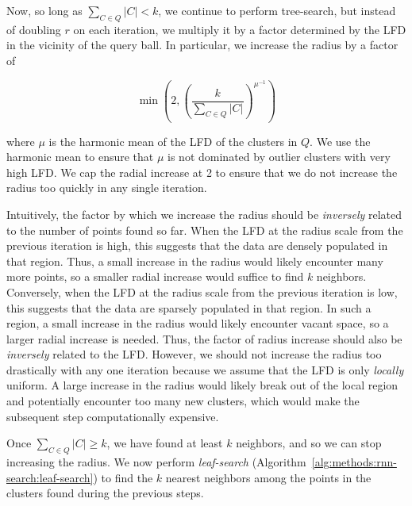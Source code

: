 Now, so long as $\sum_{C \in Q} |C| < k$, we continue to perform tree-search, but instead of doubling $r$ on each iteration, we multiply it by a factor determined by the LFD in the vicinity of the query ball.
In particular, we increase the radius by a factor of

\begin{equation}
    \min \left(2, \left( {\frac{k}{\sum_{C \in Q} |C|}} \right)^{\mu^{-1}} \right)
    \label{eq:methods:repeated-rnn-factor}
\end{equation}

where $\mu$ is the harmonic mean of the LFD of the clusters in $Q$.
We use the harmonic mean to ensure that $\mu$ is not dominated by outlier clusters with very high LFD.
We cap the radial increase at 2 to ensure that we do not increase the radius too quickly in any single iteration.

Intuitively, the factor by which we increase the radius should be \textit{inversely} related to the number of points found so far.
When the LFD at the radius scale from the previous iteration is high, this suggests that the data are densely populated in that region.
Thus, a small increase in the radius would likely encounter many more points, so a smaller radial increase would suffice to find $k$ neighbors.
Conversely, when the LFD at the radius scale from the previous iteration is low, this suggests that the data are sparsely populated in that region.
In such a region, a small increase in the radius would likely encounter vacant space, so a larger radial increase is needed.
Thus, the factor of radius increase should also be \textit{inversely} related to the LFD.
However, we should not increase the radius too drastically with any one iteration because we assume that the LFD is only \textit{locally} uniform.
A large increase in the radius would likely break out of the local region and potentially encounter too many new clusters, which would make the subsequent step computationally expensive.

Once $\sum_{C \in Q} |C| \geq k$, we have found at least $k$ neighbors, and so we can stop increasing the radius.
We now perform \textit{leaf-search} (Algorithm~\ref{alg:methods:rnn-search:leaf-search}) to find the $k$ nearest neighbors among the points in the clusters found during the previous steps.

